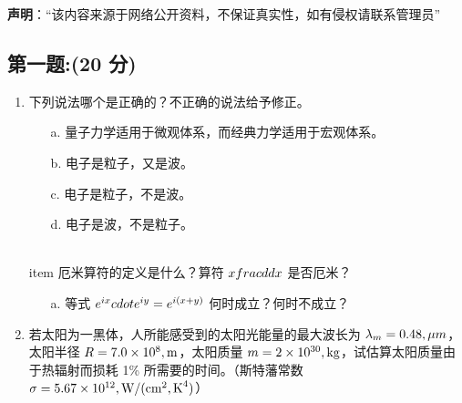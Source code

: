 
\textbf{声明}：“该内容来源于网络公开资料，不保证真实性，如有侵权请联系管理员”

\subsection{第一题:(20 分)}
\begin{enumerate}
  \item 下列说法哪个是正确的？不正确的说法给予修正。
  \begin{itemize}
    \item [a.] 量子力学适用于微观体系，而经典力学适用于宏观体系。
    \item[b.] 电子是粒子，又是波。
    \item[c.] 电子是粒子，不是波。
    \item[d.] 电子是波，不是粒子。
  \end{itemize}
  
  \\item 厄米算符的定义是什么？算符 $x \\frac{d}{dx}$ 是否厄米？
  \begin{itemize}
    \item[a.] 等式 $e^{ix} \\cdot e^{iy} = e^{i(x+y)}$ 何时成立？何时不成立？
  \end{itemize}
  
  \item 若太阳为一黑体，人所能感受到的太阳光能量的最大波长为 $\lambda_m = 0.48 \\, \mu m$，太阳半径 $R = 7.0 \times 10^8 \\, \text{m}$，太阳质量 $m = 2 \times 10^{30} \\, \text{kg}$，试估算太阳质量由于热辐射而损耗 1\% 所需要的时间。（斯特藩常数 $\sigma = 5.67 \times 10^{12} \\, \text{W} / (\text{cm}^2 \\, \text{K}^4)$）
\end{enumerate}